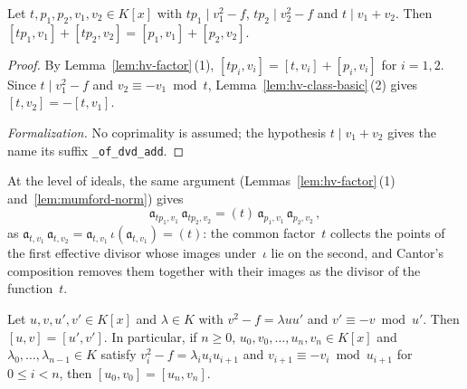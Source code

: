 \begin{lemma}
\label{lem:hv-cancel}
\leanok
{}
Let $t, p_1, p_2, v_1, v_2 \in K[x]$ with $t p_1 \mid v_1^2 - f$, $t p_2 \mid v_2^2 - f$ and
$t \mid v_1 + v_2$. Then $[t p_1, v_1] + [t p_2, v_2] = [p_1, v_1] + [p_2, v_2]$.
\end{lemma}

\begin{proof}
\leanok
{}
By Lemma~\ref{lem:hv-factor}\,(1), $[t p_i, v_i] = [t, v_i] + [p_i, v_i]$ for $i = 1, 2$. Since
$t \mid v_1^2 - f$ and $v_2 \equiv -v_1 \bmod t$, Lemma~\ref{lem:hv-class-basic}\,(2) gives
$[t, v_2] = -[t, v_1]$.

\emph{Formalization.} No coprimality is assumed; the hypothesis $t \mid v_1 + v_2$ gives the
name its suffix \texttt{\_of\_dvd\_add}.
\end{proof}

At the level of ideals, the same argument (Lemmas~\ref{lem:hv-factor}\,(1)
and~\ref{lem:mumford-norm}) gives
\[ \mathfrak a_{tp_1,v_1}\,\mathfrak a_{tp_2,v_2} =
   (t)\,\mathfrak a_{p_1,v_1}\,\mathfrak a_{p_2,v_2}\,, \]
as $\mathfrak a_{t,v_1}\,\mathfrak a_{t,v_2} = \mathfrak a_{t,v_1}\,\iota(\mathfrak a_{t,v_1})
= (t)$: the common factor~$t$ collects the points of the first effective divisor whose images
under~$\iota$ lie on the second, and Cantor's composition removes them together with their images
as the divisor of the function~$t$.

\begin{lemma}
\label{lem:hv-reduce}
\leanok
{}
Let $u, v, u', v' \in K[x]$ and $\lambda \in K$ with $v^2 - f = \lambda u u'$ and
$v' \equiv -v \bmod u'$. Then $[u, v] = [u', v']$. In particular, if $n \ge 0$,
$u_0, v_0, \dots, u_n, v_n \in K[x]$ and $\lambda_0, \dots, \lambda_{n-1} \in K$ satisfy
$v_i^2 - f = \lambda_i u_i u_{i+1}$ and $v_{i+1} \equiv -v_i \bmod u_{i+1}$ for $0 \le i < n$,
then $[u_0, v_0] = [u_n, v_n]$.
\end{lemma}


